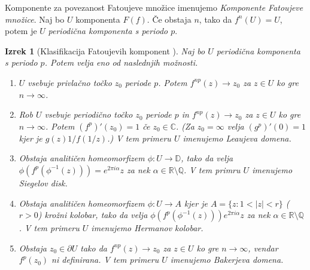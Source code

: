 \documentclass[a4paper, oneside]{amsart}
\newcommand{\QQ}{\mathbb{Q}}
\newcommand{\RR}{\mathbb{R}}
\newcommand{\CC}{\mathbb{C}}
\newcommand{\DD}{\mathbb{D}}
\theoremstyle{plain}
\newtheorem{theorem}{Izrek}[section]
\theoremstyle{definition}
\begin{document}
Komponente za povezanost Fatoujeve množice imenujemo \emph{Komponente Fatoujeve
množice}. Naj bo \(U\) komponenta \(F (f)\). Če obstaja \(n\), tako da
\(f^n (U) = U\), potem je \(U\) \emph{periodična komponenta s periodo \(p\)}. 

\begin{theorem}[Klasifikacija Fatoujevih komponent \cite{bergweiler1993}]
    Naj bo \(U\) periodična komponenta s periodo \(p\).
    Potem velja eno od naslednjih možnosti.
    \begin{enumerate}
        \item \(U\) vsebuje privlačno točko \(z_0\) periode \(p\). Potem
            \(f^{np} (z) \to z_0\) za \(z \in U\) ko gre \(n \to \infty\).
        \item Rob \(U\) vsebuje periodično točko \(z_0\) periode \(p\) in
            \(f^{np} (z) \to z_0\) za \(z \in U\) ko gre \(n \to \infty\).
            Potem \((f^p)' (z_0) = 1\) če \(z_0 \in \CC\). (Za \(z_0 = \infty\)
            velja \((g^p)' (0) = 1\) kjer je \(g (z) 1 / f (1 / z)\).)
            V tem primeru \(U\) imenujemo \emph{Leaujeva domena}.
        \item Obstaja analitičen homeomorfizem \(\phi \colon U \to \DD\), tako da
            velja \(\phi (f^p (\phi^{-1} (z))) = e^{2 \pi i \alpha} z\) za nek
            \(\alpha \in \RR \setminus \QQ\). V tem primru \(U\) imenujemo
            \emph{Siegelov disk}.
        \item Obstaja analitičen homeomorfizem \(\phi \colon U \to A\) kjer je
            \(A = \{ z : 1 < |z| < r \}\) (\(r > 0\)) krožni kolobar, tako da
            velja \(\phi (f^p (\phi^{-1} (z))) e^{2 \pi i \alpha} z\) za nek
            \(\alpha \in \RR \setminus \QQ\). V tem primeru \(U\) imenujemo
            \emph{Hermanov kolobar}.
        \item Obstaja \(z_0 \in \partial U\) tako da \(f^{np} (z) \to z_0\)
            za \(z \in U\) ko gre \(n \to \infty\), vendar \(f^p (z_0)\) ni
            definirana. V tem primeru \(U\) imenujemo \emph{Bakerjeva domena}.
    \end{enumerate}
\end{theorem}

\printbibliography
\end{document}
